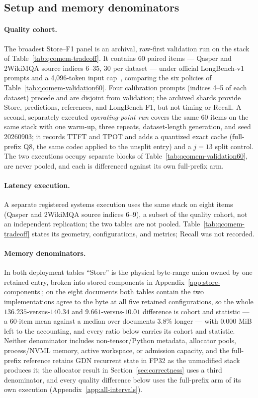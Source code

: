 \documentclass{article}
\begin{document}
\subsection{Setup and memory denominators}
\label{sec:setup}

\paragraph{Quality cohort.}
The broadest Store--F1 panel is an archival, raw-first validation run on the
stack of Table~\ref{tab:qcomem-tradeoff}. It contains 60 paired items --- Qasper
and 2WikiMQA source indices 6--35, 30 per dataset --- under official
LongBench-v1 prompts and a 4,096-token input
cap~\citep{bai2024longbench,dasigi2021qasper,ho2020multihopqa}, comparing the
six policies of Table~\ref{tab:qcomem-validation60}. Four
calibration prompts (indices 4--5 of each dataset) precede and are disjoint from
validation; the archived shards provide Store, predictions, references, and
LongBench F1, but not timing or Recall. A second, separately executed
\emph{operating-point run} covers the same 60 items on the same stack with one
warm-up, three repeats, dataset-length generation, and seed 20260903; it records
TTFT and TPOT and adds a quantized exact cache (full-prefix Q8, the same codec
applied to the unsplit entry) and a $j=13$ split control. The two executions
occupy separate blocks of Table~\ref{tab:qcomem-validation60}, are never pooled,
and each is differenced against its own full-prefix arm.

\paragraph{Latency execution.}
A separate registered systems execution uses the same stack on eight items
(Qasper and 2WikiMQA source indices 6--9), a subset of the quality cohort, not
an independent replication; the two tables are not pooled.  Table~\ref{tab:qcomem-tradeoff} states its geometry,
configurations, and metrics; Recall was not recorded.

\paragraph{Memory denominators.}
\label{sec:denominators}
In both deployment tables ``Store'' is the physical byte-range union owned by
one retained entry, broken into stored components in
Appendix~\ref{app:store-components}; on the eight documents both
tables contain the two implementations agree to the byte at all five retained
configurations, so the whole $136.235$-versus-$140.34$ and
$9.661$-versus-$10.01$ difference is cohort and statistic --- a 60-item mean
against a median over documents $3.8\%$ longer --- with $0.000$ MiB left to the
accounting, and every ratio below carries its cohort and statistic. Neither
denominator includes non-tensor/Python metadata, allocator
pools, process/NVML memory, active workspace, or admission capacity, and the
full-prefix reference retains GDN recurrent state in FP32 as the unmodified
stack produces it; the allocator result in Section~\ref{sec:correctness} uses a
third denominator, and every quality difference below uses the full-prefix arm
of its own execution (Appendix~\ref{app:all-intervals}).
\end{document}
